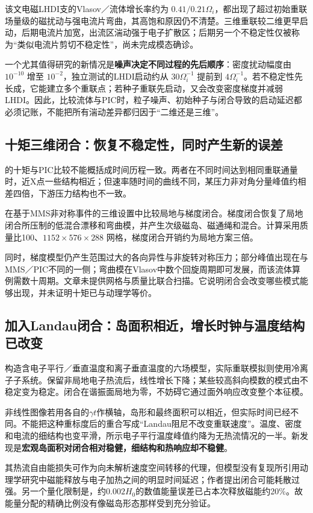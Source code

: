 \documentclass[UTF8,a4paper,11pt,openany,fontset=fandol]{ctexbook}
\begin{document}
该文电磁LHDI支的Vlasov／流体增长率约为 $0.41/0.21\Omega_i$，都出现了超过初始重联场量级的磁扰动与强电流片弯曲，其高饱和原因仍不清楚。三维重联较二维更早启动，后期电流片加宽，出流区湍动强于电子扩散区；后期另一个不稳定性仅被称为“类似电流片剪切不稳定性”，尚未完成模态确诊。

一个尤其值得研究的新情况是\textbf{噪声决定不同过程的先后顺序}：密度扰动幅度由 $10^{-10}$ 增至 $10^{-2}$，独立测试的LHDI启动约从 $30\Omega_i^{-1}$ 提前到 $4\Omega_i^{-1}$。若不稳定性先长成，它能建立多个重联点；若种子重联先启动，又会改变密度梯度并减弱LHDI。因此，比较流体与PIC时，粒子噪声、初始种子与闭合导致的启动延迟都必须记账，不能把所有湍动差异都归因于“二维还是三维”。

\subsection{十矩三维闭合：恢复不稳定性，同时产生新的误差}
\citet{Wang2015}的十矩与PIC比较不能概括成时间历程一致。两者在不同时间达到相同重联通量时，近X点一些结构相近；但速率随时间的曲线不同，某压力非对角分量峰值约相差四倍，下游压力结构也不一致。

\citet{Closure2026}在基于MMS非对称事件的三维设置中比较局地与梯度闭合。梯度闭合恢复了局地闭合所压制的低混合漂移和弯曲模，并产生次级磁岛、磁通绳和混合。计算采用质量比100、$1152\times576\times288$ 网格，梯度闭合开销约为局地方案三倍。

同时，梯度模型仍产生范围过大的各向异性与非旋转对称压力；部分峰值出现在与MMS／PIC不同的一侧；弯曲模在Vlasov中数个回旋周期即可发展，而该流体算例需数十周期。文章未提供网格与质量比联合扫描。它说明闭合会改变哪些模式能够出现，并未证明十矩已与动理学等价。

\subsection{加入Landau闭合：岛面积相近，增长时钟与温度结构已改变}
\citet{L244}构造含电子平行／垂直温度和离子垂直温度的六场模型，实际重联模拟则使用冷离子子系统。保留非局地电子热流后，线性增长下降；某些较高斜向模数的模式由不稳定变为稳定。闭合在谐振面局地为零，不妨碍它通过面外响应改变整个本征模。

非线性图像若用各自的$\gamma t$作横轴，岛形和最终面积可以相近，但实际时间已经不同。不能把这种重标度后的重合写成“Landau阻尼不改变重联速度”。温度、密度和电流的细结构也变平滑，所示电子平行温度峰值约降为无热流情况的一半。新发现是\textbf{宏观岛面积对闭合相对稳健，细结构和热响应却不稳健}。

其热流自由能损失可作为向未解析速度空间转移的代理，但模型没有复现所引用动理学研究中磁能释放与电子加热之间的明显时间延迟；作者提出闭合可能耗散过强。另一个量化限制是，约$0.002H_0$的数值能量误差已占本次释放磁能约20\%。故能量分配的精确比例没有像磁岛形态那样受到充分验证。
\end{document}

